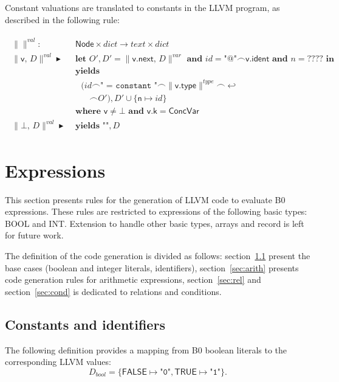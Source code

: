 \documentclass{article}
\newcommand{\trad}[2]{\ensuremath{\lVert \textsf{#1} \rVert^{\textit{#2}}}}
\newcommand{\nl}[0]{\ensuremath{\hookleftarrow}}
\DeclareMathOperator{\conc}{\smallfrown}
\DeclareMathOperator{\isdef}{\blacktriangleright}
\begin{document}
Constant valuations are translated to constants in the
LLVM program, as described in the following rule:
\begin{framed}
\begin{align}
\begin{split}
  \trad{}{val} : & \textsf{ Node} \times dict \rightarrow text \times dict \\
  \trad{v, $D$}{val} \isdef & \textbf{ let } O', D' = \trad{v.next, $D$}{var} \textbf{ and } 
  id = \texttt{"@"} \conc \textsf{v.ident} \textbf{ and }  n = ???? \textbf{ in} \\
  & \textbf{ yields } \\
  & \quad (id \conc \texttt{" = constant "} \conc \trad{v.type}{type} \conc \nl \\
  & \quad \quad \conc O'), D' \cup \{ \textsf{n} \mapsto id \} \\
  & \textbf{ where } \textsf{v} \ne \bot \textbf{ and } \textsf{v.k} = \textsf{ConcVar} \\
  \trad{$\bot$, $D$}{val} \isdef & \textbf{ yields } \texttt{""}, D
\end{split}
\end{align}
\end{framed}

\section{Expressions}
\label{sec:expr}

This section presents rules for the generation of LLVM code to
evaluate B0 expressions. These rules are restricted to expressions of
the following basic types: \textsf{BOOL} and \textsf{INT}. Extension
to handle other basic types, arrays and record is left for future
work.

The definition of the code generation is divided as follows:
section~\ref{sec:const} present the base cases (boolean and integer
literals, identifiers), section~\ref{sec:arith} presents code
generation rules for arithmetic expressions, section~\ref{sec:rel} and
section~\ref{sec:cond} is dedicated to relations and conditions.

\subsection{Constants and identifiers}
\label{sec:const}

The following definition provides a mapping from B0 boolean literals
to the corresponding LLVM values:
$$D_{bool} = \{ \textsf{FALSE} \mapsto \texttt{"0"}, \textsf{TRUE} \mapsto \texttt{"1"} \}.$$
\end{document}
